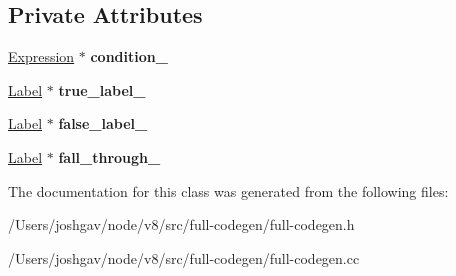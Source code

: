 \subsection*{Private Attributes}
\begin{DoxyCompactItemize}
\item 
\hyperlink{classv8_1_1internal_1_1_expression}{Expression} $\ast$ {\bfseries condition\+\_\+}\hypertarget{classv8_1_1internal_1_1_full_code_generator_1_1_test_context_a9ee041fb7a4609e2c63e83716332c866}{}\label{classv8_1_1internal_1_1_full_code_generator_1_1_test_context_a9ee041fb7a4609e2c63e83716332c866}

\item 
\hyperlink{classv8_1_1internal_1_1_label}{Label} $\ast$ {\bfseries true\+\_\+label\+\_\+}\hypertarget{classv8_1_1internal_1_1_full_code_generator_1_1_test_context_ac8e119003675bcf17a7a0871853ecd7b}{}\label{classv8_1_1internal_1_1_full_code_generator_1_1_test_context_ac8e119003675bcf17a7a0871853ecd7b}

\item 
\hyperlink{classv8_1_1internal_1_1_label}{Label} $\ast$ {\bfseries false\+\_\+label\+\_\+}\hypertarget{classv8_1_1internal_1_1_full_code_generator_1_1_test_context_aa1ad9af38174676248e98876681d9e2f}{}\label{classv8_1_1internal_1_1_full_code_generator_1_1_test_context_aa1ad9af38174676248e98876681d9e2f}

\item 
\hyperlink{classv8_1_1internal_1_1_label}{Label} $\ast$ {\bfseries fall\+\_\+through\+\_\+}\hypertarget{classv8_1_1internal_1_1_full_code_generator_1_1_test_context_afd2c7d8718721dacb6d270e2af359040}{}\label{classv8_1_1internal_1_1_full_code_generator_1_1_test_context_afd2c7d8718721dacb6d270e2af359040}

\end{DoxyCompactItemize}


The documentation for this class was generated from the following files\+:\begin{DoxyCompactItemize}
\item 
/\+Users/joshgav/node/v8/src/full-\/codegen/full-\/codegen.\+h\item 
/\+Users/joshgav/node/v8/src/full-\/codegen/full-\/codegen.\+cc\end{DoxyCompactItemize}
